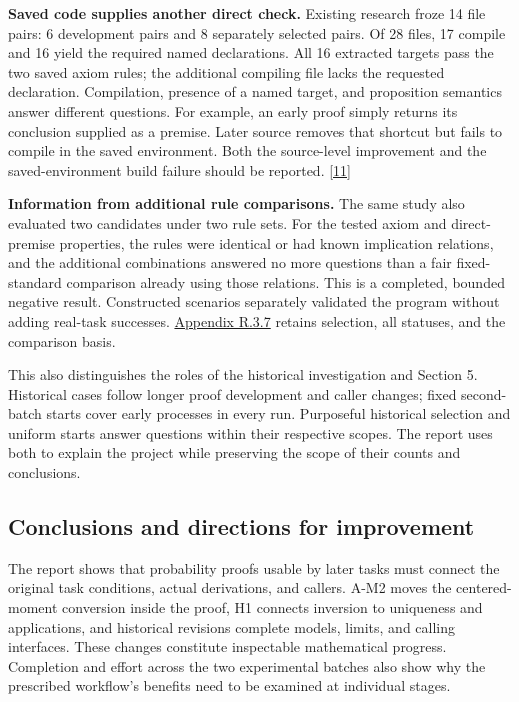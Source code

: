 \textbf{Saved code supplies another direct check.} Existing research froze 14 file pairs: 6 development pairs and 8 separately selected pairs. Of 28 files, 17 compile and 16 yield the required named declarations. All 16 extracted targets pass the two saved axiom rules; the additional compiling file lacks the requested declaration. Compilation, presence of a named target, and proposition semantics answer different questions. For example, an early proof simply returns its conclusion supplied as a premise. Later source removes that shortcut but fails to compile in the saved environment. Both the source-level improvement and the saved-environment build failure should be reported. \hyperlink{ref-11}{\mbox{[11]}}

\textbf{Information from additional rule comparisons.} The same study also evaluated two candidates under two rule sets. For the tested axiom and direct-premise properties, the rules were identical or had known implication relations, and the additional combinations answered no more questions than a fair fixed-standard comparison already using those relations. This is a completed, bounded negative result. Constructed scenarios separately validated the program without adding real-task successes. \href{en-appendix.pdf\#r3-7}{Appendix R.3.7} retains selection, all statuses, and the comparison basis.

This also distinguishes the roles of the historical investigation and Section 5. Historical cases follow longer proof development and caller changes; fixed second-batch starts cover early processes in every run. Purposeful historical selection and uniform starts answer questions within their respective scopes. The report uses both to explain the project while preserving the scope of their counts and conclusions.

\subsection[Conclusions and directions for improvement]{\texorpdfstring{\protect\hypertarget{section-6-4}{}Conclusions and directions for improvement}{Conclusions and directions for improvement}}
The report shows that probability proofs usable by later tasks must connect the original task conditions, actual derivations, and callers. A-M2 moves the centered-moment conversion inside the proof, H1 connects inversion to uniqueness and applications, and historical revisions complete models, limits, and calling interfaces. These changes constitute inspectable mathematical progress. Completion and effort across the two experimental batches also show why the prescribed workflow's benefits need to be examined at individual stages.

